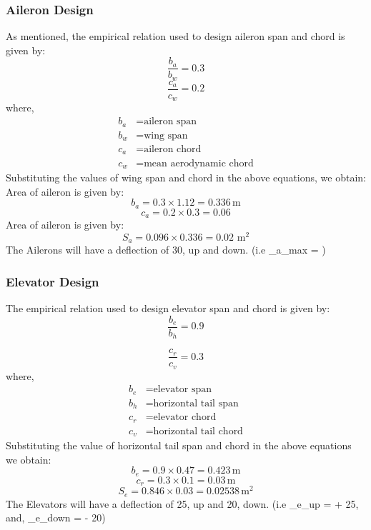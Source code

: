\documentclass[12 pt]{article}
\begin{document}
{{\subsubsection{Aileron Design}
As mentioned, the empirical relation used to design aileron span and chord is given by:
\[
\frac{{b_a}}{{b_w}} = 0.3
\]
\[
\frac{{c_a}}{{c_w}} = 0.2
\]
where,
\begin{align*}
b_a & = \text{aileron span} \\
b_w & = \text{wing span} \\
c_a & = \text{aileron chord} \\
c_w & = \text{mean aerodynamic chord}
\end{align*}
Substituting the values of wing span and chord in the above equations, we obtain:
Area of aileron is given by:
\[
b_a = 0.3 \times 1.12 = 0.336 \, \text{m}
\]
\[
c_a = 0.2 \times 0.3 = 0.06
\]
Area of aileron is given by:
\[
S_a = 0.096 \times 0.336 = 0.02 \text{ m}^2
\]
The Ailerons will have a deflection of 30\degree, up and down. (i.e \delta_{a_{max}} = \degree)

\subsubsection{Elevator Design}
The empirical relation used to design elevator span and chord is given by:
\[
\frac{{b_e}}{{b_h}} = 0.9
\]

\[
\frac{{c_r}}{{c_v}} = 0.3
\]
where,
\begin{align*}
b_e & = \text{elevator span} \\
b_h & = \text{horizontal tail span} \\
c_r & = \text{elevator chord} \\
c_v & = \text{horizontal tail chord}
\end{align*}
Substituting the value of horizontal tail span and chord in the above equations we obtain:
\[
b_e = 0.9 \times 0.47 = 0.423 \, \text{m}
\]
\[
c_r = 0.3 \times 0.1 = 0.03 \, \text{m}
\]
\[
S_e = 0.846 \times 0.03 = 0.02538 \, \text{m}^2
\]
The Elevators will have a deflection of 25\degree, up and 20\degree, down. (i.e \delta_{e_{up}} = + 25\degree, and, \delta_{e_{down}} = - 20\degree)

}}
\end{document}
